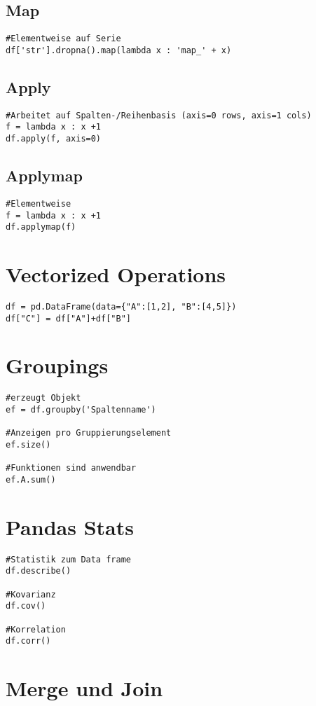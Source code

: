 \subsection{Map}
\begin{lstlisting}
#Elementweise auf Serie
df['str'].dropna().map(lambda x : 'map_' + x)
\end{lstlisting}
\subsection{Apply}
\begin{lstlisting}
#Arbeitet auf Spalten-/Reihenbasis (axis=0 rows, axis=1 cols)
f = lambda x : x +1
df.apply(f, axis=0)
\end{lstlisting}
\subsection{Applymap}
\begin{lstlisting}
#Elementweise
f = lambda x : x +1
df.applymap(f)
\end{lstlisting}
\section{Vectorized Operations}
\begin{lstlisting}
df = pd.DataFrame(data={"A":[1,2], "B":[4,5]})
df["C"] = df["A"]+df["B"]
\end{lstlisting}
\section{Groupings}
\begin{lstlisting}
#erzeugt Objekt
ef = df.groupby('Spaltenname')

#Anzeigen pro Gruppierungselement
ef.size()

#Funktionen sind anwendbar
ef.A.sum()
\end{lstlisting}
\section{Pandas Stats}
\begin{lstlisting}
#Statistik zum Data frame
df.describe()

#Kovarianz
df.cov()

#Korrelation
df.corr()
\end{lstlisting}
\section{Merge und Join}
